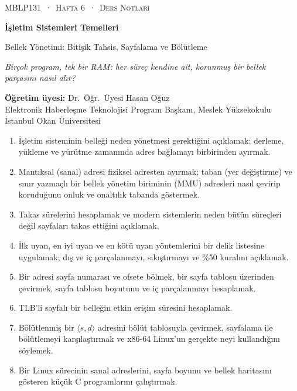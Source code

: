 \thispagestyle{empty}
\begin{tcolorbox}[enhanced,colback=dark,colframe=dark,arc=0pt,boxrule=0pt,
  left=18pt,right=18pt,top=20pt,bottom=20pt,coltext=white]
{\small\color{mint}\textsc{MBLP131 \,·\, Hafta 6 \,·\, Ders Notları}}\par\medskip
{\headfont\fontsize{26}{30}\selectfont\bfseries İşletim Sistemleri Temelleri}\par\medskip
{\large Bellek Yönetimi: Bitişik Tahsis, Sayfalama ve Bölütleme}\par\smallskip
{\small\itshape\color{white!70} Birçok program, tek bir RAM: her süreç kendine ait, korunmuş bir bellek parçasını nasıl alır?}
\end{tcolorbox}

\vspace{0.4em}
\begin{minipage}[t]{0.70\linewidth}
\small
\textbf{Öğretim üyesi:} Dr.\ Öğr.\ Üyesi Hasan Oğuz\\
Elektronik Haberleşme Teknolojisi Program Başkanı, Meslek Yüksekokulu\\
İstanbul Okan Üniversitesi
\end{minipage}

\vspace{0.8em}
\begin{keyidea}
\begin{enumerate}[leftmargin=1.4em]
  \item İşletim sisteminin belleği neden yönetmesi gerektiğini açıklamak; derleme, yükleme ve yürütme zamanında adres bağlamayı birbirinden ayırmak.
  \item Mantıksal (sanal) adresi fiziksel adresten ayırmak; taban (yer değiştirme) ve sınır yazmaçlı bir bellek yönetim biriminin (MMU) adresleri nasıl çevirip koruduğunu onluk ve onaltılık tabanda göstermek.
  \item Takas sürelerini hesaplamak ve modern sistemlerin neden bütün süreçleri değil sayfaları takas ettiğini açıklamak.
  \item İlk uyan, en iyi uyan ve en kötü uyan yöntemlerini bir delik listesine uygulamak; dış ve iç parçalanmayı, sıkıştırmayı ve \%50 kuralını açıklamak.
  \item Bir adresi sayfa numarası ve ofsete bölmek, bir sayfa tablosu üzerinden çevirmek, sayfa tablosu boyutunu ve iç parçalanmayı hesaplamak.
  \item TLB'li sayfalı bir belleğin etkin erişim süresini hesaplamak.
  \item Bölütlenmiş bir $\langle s, d\rangle$ adresini bölüt tablosuyla çevirmek, sayfalama ile bölütlemeyi karşılaştırmak ve x86-64 Linux'un gerçekte neyi kullandığını söylemek.
  \item Bir Linux sürecinin sanal adreslerini, sayfa boyunu ve bellek haritasını gösteren küçük C programlarını çalıştırmak.
\end{enumerate}
\end{keyidea}

